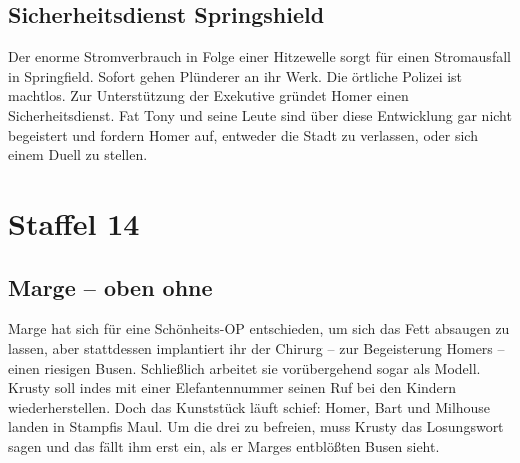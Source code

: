\subsection{Sicherheitsdienst Springshield}\label{DABF17}
Der enorme Stromverbrauch in Folge einer Hitzewelle sorgt für einen Stromausfall in Springfield. Sofort gehen Plünderer an ihr Werk. Die örtliche Polizei ist machtlos. Zur Unterstützung der Exekutive gründet Homer einen Sicherheitsdienst. Fat Tony und seine Leute sind über diese Entwicklung gar nicht begeistert und fordern Homer auf, entweder die Stadt zu verlassen, oder sich einem Duell zu stellen. 


\section{Staffel 14}

\subsection{Marge -- oben ohne}\label{DABF18}
Marge hat sich für eine Schönheits-OP entschieden, um sich das Fett absaugen zu lassen, aber stattdessen implantiert ihr der Chirurg -- zur Begeisterung Homers -- einen riesigen Busen. Schließlich arbeitet sie vorübergehend sogar als Modell.
Krusty soll indes mit einer Elefantennummer seinen Ruf bei den Kindern wiederherstellen. Doch das Kunststück läuft schief: Homer, Bart und Milhouse landen in Stampfis Maul. Um die drei zu befreien, muss Krusty das Losungswort sagen und das fällt ihm erst ein, als er Marges entblößten Busen sieht.


